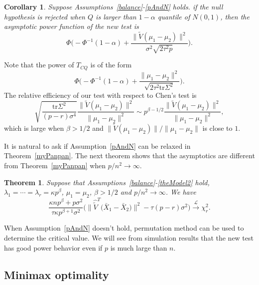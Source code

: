 \documentclass[review]{elsarticle}
\theoremstyle{plain}
\newtheorem{theorem}{\quad\quad Theorem}
\newtheorem{corollary}{\quad\quad Corollary}
\theoremstyle{definition}
\theoremstyle{remark}
\begin{document}
\begin{corollary}\label{testPowerh}
Suppose Assumptions~\ref{balance}-\ref{pAndN} holds.
    if the null hypothesis is rejected when $Q$ is larger than $1-\alpha$ quantile of $N(0,1)$, then the asymptotic power function of the new test is
    \begin{equation*}
        \Phi\Big(-\Phi^{-1}(1-\alpha)+\frac{\|\tilde{V}(\mu_1-\mu_2)\|^2}{\sigma^2\sqrt{2\tau^2p}}\Big).
    \end{equation*}
\end{corollary}


 Note that the power of $T_{CQ}$ is of the form
\begin{equation*}
    \Phi\Big(-\Phi^{-1}(1-\alpha)+\frac{\|\mu_1-\mu_2\|^2}{\sqrt{2\tau^2\mathrm{tr}\Sigma^2}}\Big).
\end{equation*}
 The relative efficiency of our test with respect to Chen's test is
\begin{equation*}
    \sqrt{\frac{\mathrm{tr}\Sigma^2}{(p-r)\sigma^4}}\frac{\|\tilde{V}(\mu_1-\mu_2)\|^2}{\|\mu_1-\mu_2\|^2}\sim p^{\beta-1/2}\frac{\|\tilde{V}(\mu_1-\mu_2)\|^2}{\|\mu_1-\mu_2\|^2},
\end{equation*}
which is large when $\beta>1/2$ and $\|\tilde{V}(\mu_1-\mu_2)\|/\|\mu_1-\mu_2\|$ is close to $1$.


It is natural to ask if Assumption~\ref{pAndN} can be relaxed in Theorem~\ref{myPanpan}.
The next theorem  shows that the asymptotics are different from Theorem~\ref{myPanpan} when $p/n^2\to \infty$.
\begin{theorem}\label{chilimthm}
    Suppose that Assumptions~\ref{balance}-\ref{theModel2} hold, $\lambda_1=\cdots=\lambda_r=\kappa p^{\beta}$,
    $\mu_1=\mu_2$, $\beta>1/2$ and $p/n^2\to \infty$. We have 
\begin{equation*}
\frac{\kappa n p^{\beta}+p\sigma^2}{\tau\kappa p^{\beta+1}\sigma^2}
        \big(
    \big\|\hat{\tilde{V}}^T\big(\bar{X}_1-\bar{X}_2\big)\big\|^2
        -\tau(p-r)\sigma^2\big)\xrightarrow{\mathcal{L}}\chi^2_r.
\end{equation*}
\end{theorem}
When Assumption~\ref{pAndN} doesn't hold,  permutation method can be used to determine the critical value.
We will see from simulation results that the new test has good power behavior even if $p$ is much large than $n$.

\subsection{Minimax optimality}
\end{document}
